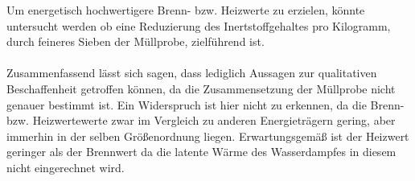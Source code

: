 Um energetisch hochwertigere Brenn- bzw. Heizwerte zu erzielen, könnte untersucht werden ob eine Reduzierung des Inertstoffgehaltes pro Kilogramm, durch feineres Sieben der Müllprobe, zielführend ist.\\ \\
Zusammenfassend lässt sich sagen, dass lediglich Aussagen zur qualitativen Beschaffenheit getroffen können, da die Zusammensetzung der Müllprobe nicht genauer bestimmt ist. Ein Widerspruch ist hier nicht zu erkennen, da die Brenn- bzw. Heizwertewerte zwar im Vergleich zu anderen Energieträgern gering, aber immerhin in der selben Größenordnung liegen.\linebreak
Erwartungsgemäß ist der Heizwert geringer als der Brennwert da die latente Wärme des Wasserdampfes in diesem nicht eingerechnet wird.\\


